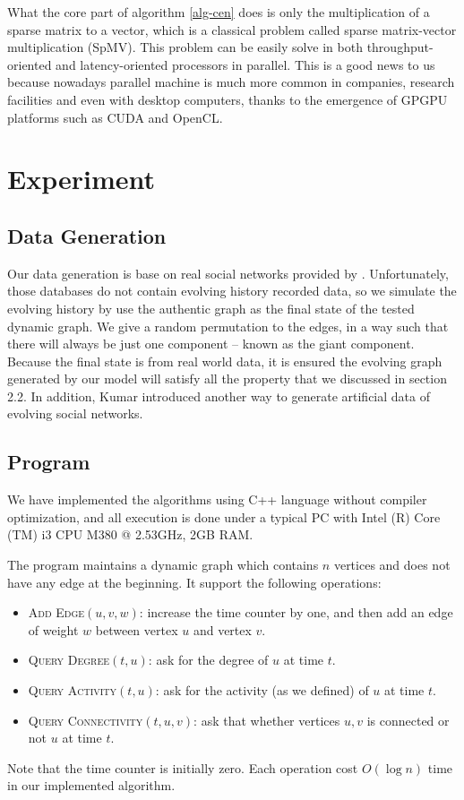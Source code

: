 \documentclass[12pt,abstract=true]{scrartcl}
\numberwithin{equation}{section}
\theoremstyle{definition}   \newtheorem{definition}{Definition}[section]
\theoremstyle{plain}        \newtheorem{theorem}{Theorem}[section]
\theoremstyle{plain}        \newtheorem{observation}{Observation}[section]
\theoremstyle{plain}        \newtheorem{fact}{Fact}[section]
\theoremstyle{plain}        \newtheorem{claim}{Claim}[section]
\theoremstyle{plain}        \newtheorem{lemma}[theorem]{Lemma}
\theoremstyle{plain}        \newtheorem{corollary}[theorem]{Corollary}
\theoremstyle{remark}       \newtheorem{example}{Example}[section]
\theoremstyle{remark}       \newtheorem{remark}{Remark}[section]
\begin{document}
What the core part of algorithm \ref{alg-cen} does is only the multiplication
of a sparse matrix to a vector, which is a classical problem called sparse
matrix-vector multiplication (SpMV). This problem can be easily solve in both
throughput-oriented and latency-oriented processors in
parallel\cite{williams2009optimization, bell2008efficient,
bell2009implementing, catalyurek1999hypergraph, zhuo2005sparse}.  This is a
good news to us because nowadays parallel machine is much more common in
companies, research facilities and even with desktop computers, thanks to the
emergence of GPGPU platforms such as CUDA and OpenCL.

\section{Experiment}
\subsection{Data Generation} 
Our data generation is base on real social networks provided by \cite{database1,
database2}. Unfortunately, those databases do not contain evolving history
recorded data, so we simulate the evolving history by use the
authentic graph as the final state of the tested dynamic graph.
We give a random permutation to the edges, in a way such that there will always
be just one component -- known as the giant component. Because the final state
is from real world data, it is ensured 
the evolving graph generated by our model will satisfy all the property that we
discussed in section 2.2. In addition, Kumar introduced another way to generate
artificial data of evolving social networks\cite{kumar2010structure}.

\subsection{Program}
We have implemented the algorithms using C++ language without compiler
optimization, and all execution is done under a typical PC with 
Intel (R) Core (TM) i3 CPU M380  @ 2.53GHz, 2GB RAM.
	
The program maintains a dynamic graph which contains $n$ vertices and does not
have any edge at the beginning.
It support the following operations:
\begin{itemize}
	\item \textsc{Add Edge$(u,v,w)$:} increase the time counter by one, and then add an edge
		of weight $w$ between vertex $u$ and vertex $v$.
	\item \textsc{Query Degree$(t,u)$:} ask for the degree of $u$ at time $t$.
	\item \textsc{Query Activity$(t,u)$:} ask for the activity (as we defined) of $u$ at time $t$.
	\item \textsc{Query Connectivity$(t,u,v)$:} ask that whether vertices $u,v$ is connected or not
		$u$ at time $t$.
\end{itemize}
Note that the time counter is initially zero.
Each operation cost $O(\log n)$ time in our implemented algorithm.
\end{document}
